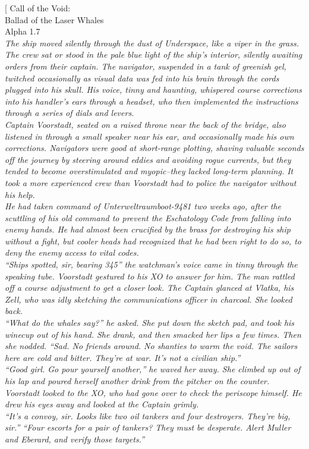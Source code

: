 \documentclass[a4paper, twocolumn, openany]{book}
\begin{document}
\pagestyle{empty}
{\normalsize %
\twocolumn[{
	{\centering
	{\LARGE
	Call of the Void:\\
	Ballad of the Laser Whales\\
	} %
	Alpha 1.7\\[\baselineskip]
	} %
	{\itshape
	The ship moved silently through the dust of Underspace, like a viper in the grass. The crew sat
	or stood in the pale blue light of the ship’s interior, silently awaiting orders from their captain.
	The navigator, suspended in a tank of greenish gel, twitched occasionally as visual data was fed
	into his brain through the cords plugged into his skull. His voice, tinny and haunting, whispered
	course corrections into his handler’s ears through a headset, who then implemented the
	instructions through a series of dials and levers.\\
	Captain Voorstadt, seated on a raised throne near the back of the bridge, also listened in
	through a small speaker near his ear, and occasionally made his own corrections. Navigators
	were good at short-range plotting, shaving valuable seconds off the journey by steering around
	eddies and avoiding rogue currents, but they tended to become overstimulated and
	myopic--they lacked long-term planning. It took a more experienced crew than Voorstadt had to
	police the navigator without his help.\\
	He had taken command of Unterweltraumboot-9481 two weeks ago, after the scuttling of his old
	command to prevent the Eschatology Code from falling into enemy hands. He had almost been
	crucified by the brass for destroying his ship without a fight, but cooler heads had recognized
	that he had been right to do so, to deny the enemy access to vital codes.\\
	“Ships spotted, sir, bearing 345” the watchman’s voice came in tinny through the speaking tube.
	Voorstadt gestured to his XO to answer for him. The man rattled off a course adjustment to get
	a closer look. The Captain glanced at Vlatka, his Zell, who was idly sketching the
	communications officer in charcoal. She looked back.\\
	“What do the whales say?” he asked. She put down the sketch pad, and took his winecup out of
	his hand. She drank, and then smacked her lips a few times. Then she nodded.
	“Sad. No friends around. No shanties to warm the void. The sailors here are cold and bitter.
	They’re at war. It’s not a civilian ship.”\\
	“Good girl. Go pour yourself another,” he waved her away. She climbed up out of his lap and
	poured herself another drink from the pitcher on the counter. Voorstadt looked to the XO, who
	had gone over to check the periscope himself. He drew his eyes away and looked at the
	Captain grimly.\\
	“It’s a convoy, sir. Looks like two oil tankers and four destroyers. They’re big, sir.”
	“Four escorts for a pair of tankers? They must be desperate. Alert Muller and Eberard, and
	verify those targets.”\\

}}}
\end{document}
